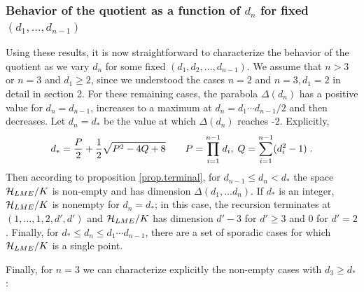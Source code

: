 \documentclass[12pt]{article}
\theoremstyle{definition}
\begin{document}
\subsubsection*{Behavior of the quotient as a function of $d_n$ for fixed $(d_1, \dots, d_{n-1})$}

Using these results, it is now straightforward to characterize the behavior of the quotient as we vary $d_n$ for some fixed $(d_1,d_2,\dots,d_{n-1})$. We assume that $n > 3$ or $n=3$ and $d_1 \ge 2$, since we understood the cases $n=2$ and $n=3, d_1=2$ in detail in section 2. For these remaining cases, the parabola $\Delta(d_n)$ has a positive value for $d_n = d_{n-1}$, increases to a maximum at $d_n = d_1 \cdots d_{n-1}/2$ and then decreases. Let $d_n = d_*$ be the value at which $\Delta(d_n)$ reaches -2. Explicitly,
\[
d_* = {P \over 2} + {1 \over 2}\sqrt{P^2 - 4 Q + 8} \qquad  P = \prod_{i=1}^{n-1} d_i,\;  Q = \sum_{i=1}^{n-1} (d_i^2 - 1) \; .
\]
Then according to proposition \ref{prop.terminal}, for $d_{n-1} \le d_n < d_*$ the space ${\cal H}_{LME}/K$ is non-empty and has dimension $\Delta(d_1, \dots d_n)$.  If $d_*$ is an integer, ${\cal H}_{LME}/K$ is nonempty for $d_n= d_*$; in this case, the recursion terminates at $(1,\dots,1,2,d',d')$ and ${\cal H}_{LME}/K$ has dimension $d'-3$ for $d' \ge 3$ and $0$ for $d' = 2$. Finally, for $d_* \le d_n \le d_1 \cdots d_{n-1}$, there are a set of sporadic cases for which ${\cal H}_{LME}/K$ is a single point.

Finally, for $n=3$ we can characterize explicitly the non-empty cases with $d_3 \ge d_*$:
\end{document}
